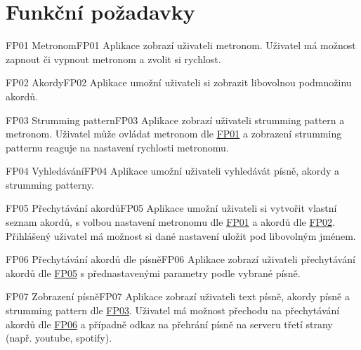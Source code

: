 \section{Funkční požadavky}
\label{sc:functional_req}

\begin{requirment}{FP01 Metronom}{FP01}
    Aplikace zobrazí uživateli metronom. Uživatel má možnost zapnout či vypnout metronom a zvolit si rychlost.
\end{requirment}

\begin{requirment}{FP02 Akordy}{FP02}
    Aplikace umožní uživateli si zobrazit libovolnou podmnožinu akordů.
\end{requirment}

\begin{requirment}{FP03 Strumming pattern}{FP03}
    Aplikace zobrazí uživateli strumming pattern a metronom. Uživatel může ovládat metronom dle \hyperref[FP01]{FP01} a zobrazení strumming patternu reaguje na nastavení rychlosti metronomu.
\end{requirment}

\begin{requirment}{FP04 Vyhledávání}{FP04}
    Aplikace umožní uživateli vyhledávát písně, akordy a strumming patterny.
\end{requirment}

\begin{requirment}{FP05 Přechytávání akordů}{FP05}
    Aplikace umožní uživateli si vytvořit vlastní seznam akordů, s volbou nastavení metronomu dle \hyperref[FP01]{FP01} a akordů dle \hyperref[FP02]{FP02}.
    Přihlášený uživatel má možnost si dané nastavení uložit pod libovolným jménem.
\end{requirment}

\begin{requirment}{FP06 Přechytávání akordů dle písně}{FP06}
    Aplikace zobrazí uživateli přechytávání akordů dle \hyperref[FP05]{FP05} s přednastavenými parametry podle vybrané písně.
\end{requirment}

\begin{requirment}{FP07 Zobrazení písně}{FP07}
    Aplikace zobrazí uživateli text písně, akordy písně a strumming pattern dle \hyperref[FP03]{FP03}. Uživatel má možnost přechodu na přechytávání akordů dle \hyperref[FP06]{FP06} a případně odkaz na přehrání písně na serveru třetí strany (např. youtube, spotify).
\end{requirment}

